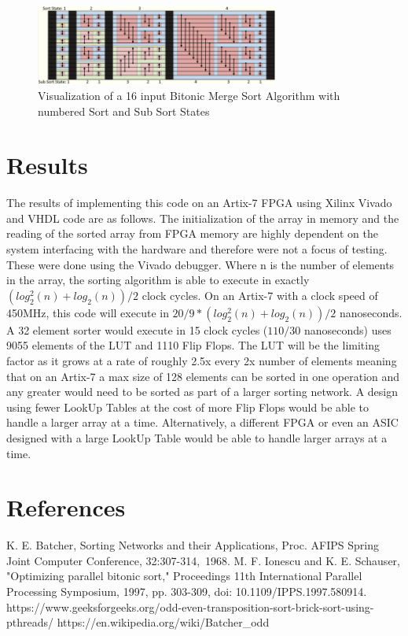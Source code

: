 \documentclass[conference]{IEEEtran}
\begin{document}
\begin{figure}[h!]
  \centering
  \includegraphics[width=8cm]{bitonic sorting.png} 
  \caption{Visualization of a 16 input Bitonic Merge Sort Algorithm with numbered Sort and Sub Sort States}
  \label{figwiki}
 \end{figure}


\section*{Results}
The results of implementing this code on an Artix-7 FPGA using Xilinx Vivado and VHDL code are as follows. The initialization of the array in memory and the reading of the sorted array from FPGA memory are highly dependent on the system interfacing with the hardware and therefore were not a focus of testing. These were done using the Vivado debugger. Where n is the number of elements in the array, the sorting algorithm is able to execute in exactly \((log^2_2(n) + log_2(n))/2\) clock cycles. On an Artix-7 with a clock speed of 450MHz, this code will execute in \(20/9*(log^2_2(n) + log_2(n))/2\) nanoseconds. A 32 element sorter would execute in 15 clock cycles (\(110/30\) nanoseconds) uses 9055 elements of the LUT and 1110 Flip Flops. The LUT will be the limiting factor as it grows at a rate of roughly 2.5x every 2x number of elements meaning that on an Artix-7 a max size of 128 elements can be sorted in one operation and any greater would need to be sorted as part of a larger sorting network. A design using fewer LookUp Tables at the cost of more Flip Flops would be able to handle a larger array at a time. Alternatively, a different FPGA or even an ASIC designed with a large LookUp Table would be able to handle larger arrays at a time.


\section*{References}


\begin{thebibliography}{00}
 K. E. Batcher, Sorting Networks and their Applications, Proc. AFIPS Spring Joint Computer Conference, 32:307-314, 1968.
 M. F. Ionescu and K. E. Schauser, "Optimizing parallel bitonic sort," Proceedings 11th International Parallel Processing Symposium, 1997, pp. 303-309, doi: 10.1109/IPPS.1997.580914.
 https://www.geeksforgeeks.org/odd-even-transposition-sort-brick-sort-using-pthreads/
https://en.wikipedia.org/wiki/Batcher_odd%

\end{thebibliography}
\vspace{12pt}
\end{document}
